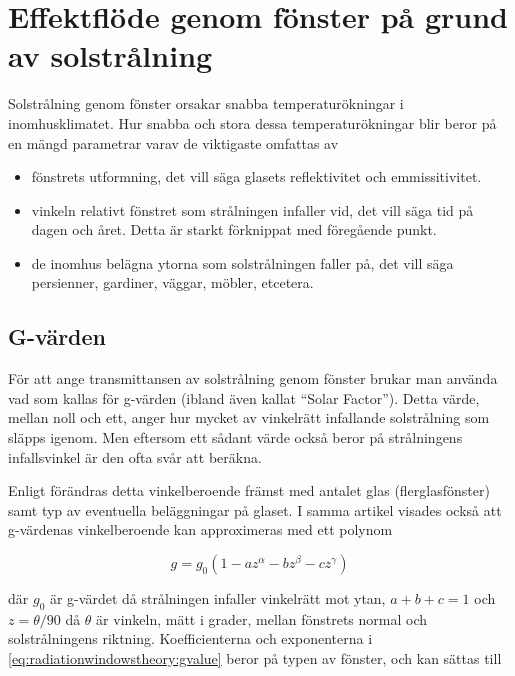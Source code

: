 \section{Effektflöde genom fönster på grund av solstrålning}

Solstrålning genom fönster orsakar snabba temperaturökningar i inomhusklimatet. Hur snabba och stora dessa temperaturökningar blir beror på en mängd parametrar varav de viktigaste omfattas av

\begin{itemize}
\item{
fönstrets utformning, det vill säga glasets reflektivitet och emmissitivitet.
}
\item{
vinkeln relativt fönstret som strålningen infaller vid, det vill säga tid på dagen och året. Detta är starkt förknippat med föregående punkt. 
}
\item{
de inomhus belägna ytorna som solstrålningen faller på, det vill säga persienner, gardiner, väggar, möbler, etcetera.
}
\end{itemize} 

\subsection{G-värden}\label{gvalue}

För att ange transmittansen av solstrålning genom fönster brukar man använda vad som kallas för g-värden (ibland även kallat ``Solar Factor''). Detta värde, mellan noll och ett, anger hur mycket av vinkelrätt infallande solstrålning som släpps igenom. Men eftersom ett sådant värde också beror på strålningens infallsvinkel är den ofta svår att beräkna.

Enligt \cite{karlssonroos99} förändras detta vinkelberoende främst med antalet glas (flerglasfönster) samt typ av eventuella beläggningar på glaset. I samma artikel visades också att g-värdenas vinkelberoende kan approximeras med ett polynom

\begin{equation}\label{eq:radiationwindowstheory:gvalue}
g = g_0 \left( 1 - az^{\alpha} - bz^{\beta} - cz^{\gamma} \right)
\end{equation}

där $g_0$ är g-värdet då strålningen infaller vinkelrätt mot ytan, $a+b+c=1$ och $z=\theta/90$ då $\theta$ är vinkeln, mätt i grader, mellan fönstrets normal och solstrålningens riktning. Koefficienterna och exponenterna i \eqref{eq:radiationwindowstheory:gvalue} beror på typen av fönster, och kan sättas till

